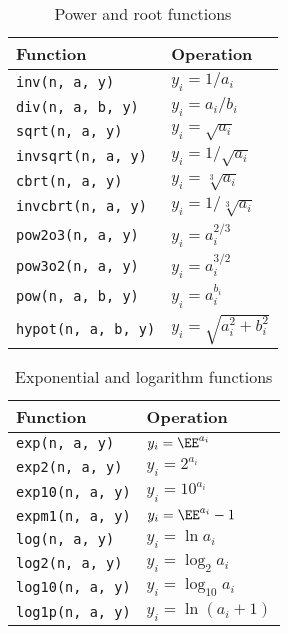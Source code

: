 \begin{table}
  \begin{tabularx}{\textwidth}{LL}
    \toprule
    Function & Operation \\
    \midrule
    \verb|inv(n, a, y)|      & $y_i = 1 / a_i$              \\
    \verb|div(n, a, b, y)|   & $y_i = a_i / b_i$            \\
    \verb|sqrt(n, a, y)|     & $y_i = \sqrt{a_i}$           \\
    \verb|invsqrt(n, a, y)|  & $y_i = 1 / \sqrt{a_i}$       \\
    \verb|cbrt(n, a, y)|     & $y_i = \sqrt[3]{a_i}$        \\
    \verb|invcbrt(n, a, y)|  & $y_i = 1 / \sqrt[3]{a_i}$    \\
    \verb|pow2o3(n, a, y)|   & $y_i = a_i^{2/3}$            \\
    \verb|pow3o2(n, a, y)|   & $y_i = a_i^{3/2}$            \\
    \verb|pow(n, a, b, y)|   & $y_i = a_i^{b_i}$            \\
    \verb|hypot(n, a, b, y)| & $y_i = \sqrt{a_i^2 + b_i^2}$ \\
    \bottomrule
  \end{tabularx}
  \caption{Power and root functions}
  \label{tab:Power and root functions}
\end{table}

\begin{table}
  \begin{tabularx}{\textwidth}{LL}
    \toprule
    Function & Operation \\
    \midrule
    \verb|exp(n, a, y)|   & $y_i = \EE^{a_i}$     \\
    \verb|exp2(n, a, y)|  & $y_i = 2^{a_i}$       \\
    \verb|exp10(n, a, y)| & $y_i = 10^{a_i}$      \\
    \verb|expm1(n, a, y)| & $y_i = \EE^{a_i} - 1$ \\
    \verb|log(n, a, y)|   & $y_i = \ln a_i$       \\
    \verb|log2(n, a, y)|  & $y_i = \log_2 a_i$    \\
    \verb|log10(n, a, y)| & $y_i = \log_{10} a_i$ \\
    \verb|log1p(n, a, y)| & $y_i = \ln(a_i + 1)$  \\
    \bottomrule
  \end{tabularx}
  \caption{Exponential and logarithm functions}
  \label{tab:Exponential and logarithm functions}
\end{table}

